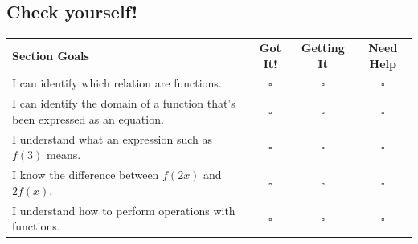 \documentclass[oneside,10pt]{book}
\begin{document}
\newpage



\subsection*{Check yourself!}


\begin{tabular}{@{}p{4.5in} c c c}
\textbf{Section Goals} & \textbf{Got It!} & \textbf{Getting It} & \textbf{Need Help}\\
I can identify which relation are functions. & $\square$ & $\square$ & $\square $ \\
I can identify the domain of a function that's been expressed as an equation. & $\square$ & $\square$ & $\square $ \\
I understand what an expression such as $f(3)$ means. & $\square$ & $\square$ & $\square $ \\
I know the difference between $f(2x)$ and $2f(x)$. & $\square$ & $\square$ & $\square $ \\
I understand how to perform operations with functions. & $\square$ & $\square$ & $\square $ \\


\end{tabular}
\end{document}
